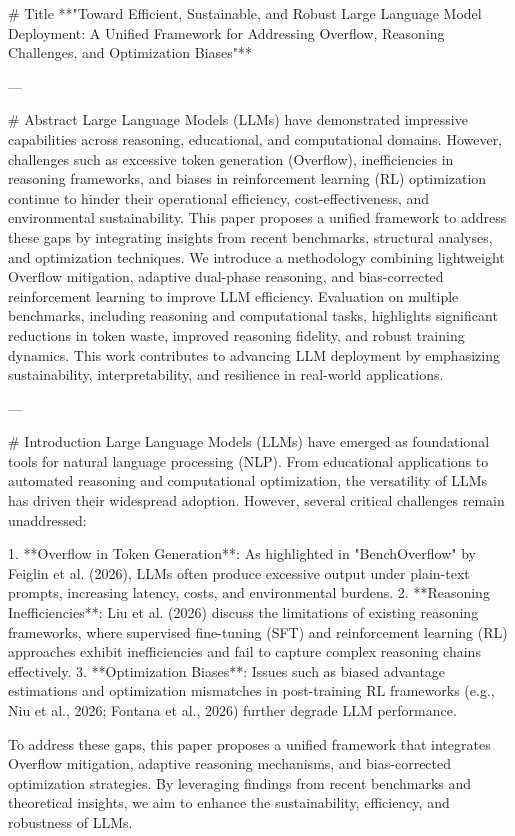 # Title  
**"Toward Efficient, Sustainable, and Robust Large Language Model Deployment: A Unified Framework for Addressing Overflow, Reasoning Challenges, and Optimization Biases"**

---

# Abstract  
Large Language Models (LLMs) have demonstrated impressive capabilities across reasoning, educational, and computational domains. However, challenges such as excessive token generation (Overflow), inefficiencies in reasoning frameworks, and biases in reinforcement learning (RL) optimization continue to hinder their operational efficiency, cost-effectiveness, and environmental sustainability. This paper proposes a unified framework to address these gaps by integrating insights from recent benchmarks, structural analyses, and optimization techniques. We introduce a methodology combining lightweight Overflow mitigation, adaptive dual-phase reasoning, and bias-corrected reinforcement learning to improve LLM efficiency. Evaluation on multiple benchmarks, including reasoning and computational tasks, highlights significant reductions in token waste, improved reasoning fidelity, and robust training dynamics. This work contributes to advancing LLM deployment by emphasizing sustainability, interpretability, and resilience in real-world applications.

---

# Introduction  
Large Language Models (LLMs) have emerged as foundational tools for natural language processing (NLP). From educational applications to automated reasoning and computational optimization, the versatility of LLMs has driven their widespread adoption. However, several critical challenges remain unaddressed:

1. **Overflow in Token Generation**: As highlighted in "BenchOverflow" by Feiglin et al. (2026), LLMs often produce excessive output under plain-text prompts, increasing latency, costs, and environmental burdens.
2. **Reasoning Inefficiencies**: Liu et al. (2026) discuss the limitations of existing reasoning frameworks, where supervised fine-tuning (SFT) and reinforcement learning (RL) approaches exhibit inefficiencies and fail to capture complex reasoning chains effectively.
3. **Optimization Biases**: Issues such as biased advantage estimations and optimization mismatches in post-training RL frameworks (e.g., Niu et al., 2026; Fontana et al., 2026) further degrade LLM performance.

To address these gaps, this paper proposes a unified framework that integrates Overflow mitigation, adaptive reasoning mechanisms, and bias-corrected optimization strategies. By leveraging findings from recent benchmarks and theoretical insights, we aim to enhance the sustainability, efficiency, and robustness of LLMs.

